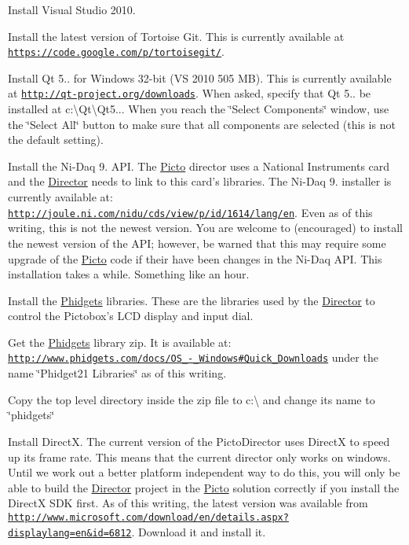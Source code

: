 \begin{DoxyEnumerate}
\item Install Visual Studio 2010.
\item Install the latest version of Tortoise Git. This is currently available at \href{https://code.google.com/p/tortoisegit/}{\tt https\-://code.\-google.\-com/p/tortoisegit/}.
\item Install Qt 5.. for Windows 32-\/bit (V\-S 2010 505 M\-B). This is currently available at \href{http://qt-project.org/downloads}{\tt http\-://qt-\/project.\-org/downloads}. When asked, specify that Qt 5.. be installed at c\-:\textbackslash{}Qt\textbackslash{}\-Qt5... When you reach the \char`\"{}\-Select Components\char`\"{} window, use the \char`\"{}\-Select All\char`\"{} button to make sure that all components are selected (this is not the default setting).
\item Install the Ni-\/\-Daq 9. A\-P\-I. The \hyperlink{namespace_picto}{Picto} director uses a National Instruments card and the \hyperlink{class_director}{Director} needs to link to this card's libraries. The Ni-\/\-Daq 9. installer is currently available at\-: \href{http://joule.ni.com/nidu/cds/view/p/id/1614/lang/en}{\tt http\-://joule.\-ni.\-com/nidu/cds/view/p/id/1614/lang/en}. Even as of this writing, this is not the newest version. You are welcome to (encouraged) to install the newest version of the A\-P\-I; however, be warned that this may require some upgrade of the \hyperlink{namespace_picto}{Picto} code if their have been changes in the Ni-\/\-Daq A\-P\-I. This installation takes a while. Something like an hour.
\item Install the \hyperlink{class_phidgets}{Phidgets} libraries. These are the libraries used by the \hyperlink{class_director}{Director} to control the Pictobox's L\-C\-D display and input dial.
\begin{DoxyEnumerate}
\item Get the \hyperlink{class_phidgets}{Phidgets} library zip. It is available at\-: \href{http://www.phidgets.com/docs/OS_-_Windows#Quick_Downloads}{\tt http\-://www.\-phidgets.\-com/docs/\-O\-S\-\_\--\/\-\_\-\-Windows\#\-Quick\-\_\-\-Downloads} under the name \char`\"{}\-Phidget21 Libraries\char`\"{} as of this writing.
\item Copy the top level directory inside the zip file to c\-:\textbackslash{} and change its name to \char`\"{}phidgets\char`\"{}
\end{DoxyEnumerate}
\item Install Direct\-X. The current version of the Picto\-Director uses Direct\-X to speed up its frame rate. This means that the current director only works on windows. Until we work out a better platform independent way to do this, you will only be able to build the \hyperlink{class_director}{Director} project in the \hyperlink{namespace_picto}{Picto} solution correctly if you install the Direct\-X S\-D\-K first. As of this writing, the latest version was available from \href{http://www.microsoft.com/download/en/details.aspx?displaylang=en&id=6812}{\tt http\-://www.\-microsoft.\-com/download/en/details.\-aspx?displaylang=en\&id=6812}. Download it and install it.

\end{DoxyEnumerate}
